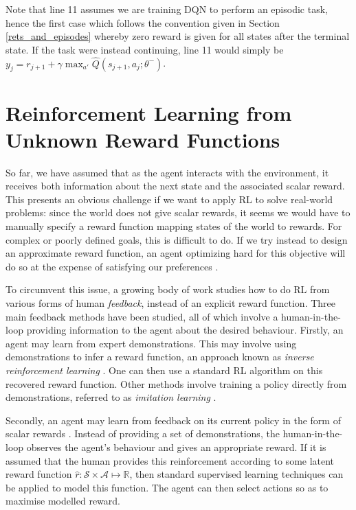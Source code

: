 \documentclass[11pt, a4paper, bibliography=totoc]{report}
\newcommand{\reals}{\mathbb{R}}
\begin{document}
Note that line 11 assumes we are training DQN to perform an episodic task, hence the first case which follows the convention given in Section \ref{rets_and_episodes} whereby zero reward is given for all states after the terminal state. If the task were instead continuing, line 11 would simply be $ y_j = r_{j+1} + \gamma \max_{a'} \hat{Q}(s_{j+1}, a_j ; \theta^- ) $.


\section{Reinforcement Learning from Unknown Reward Functions}
So far, we have assumed that as the agent interacts with the environment, it receives both information about the next state and the associated scalar reward. This presents an obvious challenge if we want to apply RL to solve real-world problems: since the world does not give scalar rewards, it seems we would have to manually specify a reward function mapping states of the world to rewards. For complex or poorly defined goals, this is difficult to do. If we try instead to design an approximate reward function, an agent optimizing hard for this objective will do so at the expense of satisfying our preferences \cite[p.~1]{Christiano2017}.

To circumvent this issue, a growing body of work studies how to do RL from various forms of human \textit{feedback}, instead of an explicit reward function. Three main feedback methods have been studied, all of which involve a human-in-the-loop providing information to the agent about the desired behaviour. Firstly, an agent may learn from expert demonstrations. This may involve using demonstrations to infer a reward function, an approach known as \textit{inverse reinforcement learning} \cite{Ng2000, Ziebart2008}. One can then use a standard RL algorithm on this recovered reward function. Other methods involve training a policy directly from demonstrations, referred to as \textit{imitation learning} \cite{Ho2016, Hester2017}.

Secondly, an agent may learn from feedback on its current policy in the form of scalar rewards \cite{Knox2009, Warnell2017}. Instead of providing a set of demonstrations, the human-in-the-loop observes the agent's behaviour and gives an appropriate reward. If it is assumed that the human provides this reinforcement according to some latent reward function $ \hat{r} : \mathcal{S} \times \mathcal{A} \mapsto \reals $, then standard supervised learning techniques can be applied to model this function. The agent can then select actions so as to maximise modelled reward.
\end{document}
